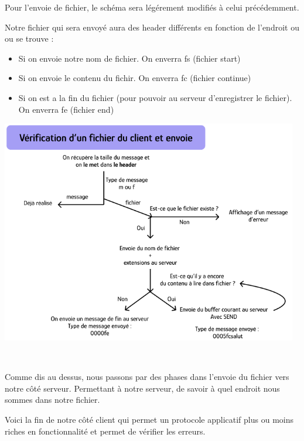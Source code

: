 Pour l'envoie de fichier, le schéma sera légérement modifiés à celui précédemment. \\ \par

Notre fichier qui sera envoyé aura des header différents en fonction de l'endroit ou ou se trouve :
\begin{itemize}
    \item Si on envoie notre nom de fichier. On enverra fs (fichier start)
    \item Si on envoie le contenu du fichir. On enverra fc (fichier continue)
    \item Si on est a la fin du fichier (pour pouvoir au serveur d'enregistrer le fichier). On enverra fe (fichier end)
\end{itemize}

    {
    \centering
    \includegraphics[width=13cm]{figures/verification_fichier_client_envoie.png}
    \par
    } \hfill \\ \par

    Comme dis au dessus, nous passons par des phases dans l'envoie du fichier vers notre côté serveur. Permettant à notre serveur, de savoir à quel endroit nous sommes dans notre fichier.

    Voici la fin de notre côté client qui permet un protocole applicatif plus ou moins riches en fonctionnalité et permet de vérifier les erreurs.